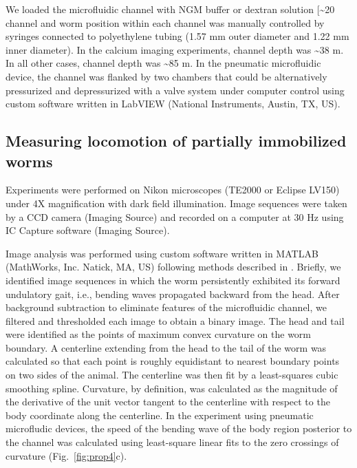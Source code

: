 We loaded the microfluidic channel with NGM buffer or dextran solution [\textasciitilde 20\\%
channel and worm position within each channel was manually controlled by syringes connected 
to polyethylene tubing (1.57 mm outer diameter and 1.22 mm inner diameter). In the calcium 
imaging experiments, channel depth was \textasciitilde 38 \textmu m. In all other cases, channel depth was \textasciitilde 85 \textmu m. 
In the pneumatic microfluidic device, the channel was flanked by two chambers that could be 
alternatively pressurized and depressurized with a valve system under computer control using 
custom software written in LabVIEW (National Instruments, Austin, TX, US). 


\subsection{Measuring locomotion of partially immobilized worms}

Experiments were performed on 
Nikon microscopes (TE2000 or Eclipse LV150) under 4X magnification with dark field 
illumination. Image sequences were taken by a CCD camera (Imaging Source) and recorded on a 
computer at 30 Hz using IC Capture software (Imaging Source).  
 
Image analysis was performed using custom  software written in MATLAB (MathWorks, Inc. 
Natick, MA, US) following methods described in \citep{fang-yen_biomechanical_2010}. Briefly, we identified image sequences in 
which the worm persistently exhibited its forward undulatory gait, i.e., bending waves 
propagated backward from the head. After background subtraction to eliminate features of the 
microfluidic channel, we filtered and thresholded each image to obtain a binary image. The head 
and tail were identified as the points of maximum convex curvature on the worm boundary. A 
centerline extending from the head to the tail of the worm was calculated so that each point is 
roughly equidistant to nearest boundary points on two sides of the animal. The centerline was 
then fit by a least-squares cubic smoothing spline. Curvature, by definition, was calculated as the 
magnitude of the derivative of the unit vector tangent to the centerline with respect to the body 
coordinate along the centerline. In the experiment using pneumatic microfludic devices, the 
speed of the bending wave of the body region posterior to the channel was calculated using least-square linear fits to the zero crossings of curvature (Fig.~\ref{fig:prop4}c). 



